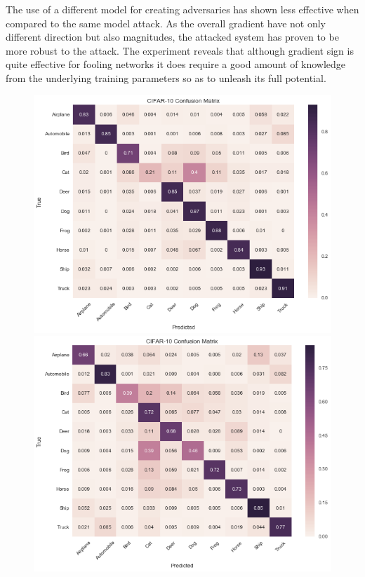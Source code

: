 \documentclass[runningheads,a4paper]{llncs}
\begin{document}
The use of a different model for creating adversaries has shown less effective when compared to the same model attack. As the overall gradient have not only different direction but also magnitudes, the attacked system has proven to be more robust to the attack. The experiment reveals that although gradient sign is quite effective for fooling networks it does require a good amount of knowledge from the underlying training parameters so as to unleash its full potential. 


\begin{figure}
	\begin{minipage}[b]{0.55\linewidth}
		\centering
		\includegraphics[width=1\linewidth]{cat_undersampling_per.png} 
	\end{minipage}%
	\begin{minipage}[b]{0.55\linewidth}
		\centering
		\includegraphics[width=1\linewidth]{cat_oversampling_per.png} 

\end{minipage}
\end{figure}
\end{document}
